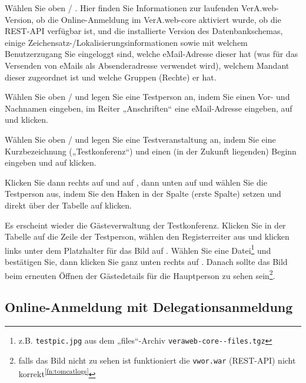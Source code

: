 Wählen Sie oben  / . Hier
finden Sie Informationen zur laufenden VerA.web-Version,
\ifoa
ob die Online-Anmeldung im VerA.web-core aktiviert wurde,
\fi%
ob die REST-API verfügbar ist, und die installierte Version des
Datenbankschemas, einige Zeichensatz-/Lokalisierungsinformationen sowie
mit welchem Benutzerzugang Sie eingeloggt sind, welche eMail-Adresse
dieser hat (was für das Versenden von eMails als Absenderadresse
verwendet wird), welchem Mandant dieser zugeordnet ist und welche
Gruppen (Rechte) er hat.

Wählen Sie oben  / 
und legen Sie eine Testperson an, indem Sie einen Vor- und Nachnamen
eingeben, im Reiter „Anschriften“ eine eMail-Adresse eingeben, auf
 und
 klicken.

Wählen Sie oben  /  und legen Sie eine Testveranstaltung an, indem Sie eine
Kurzbezeichnung („Testkonferenz“) und einen (in der Zukunft liegenden)
Beginn eingeben und auf  klicken.

Klicken Sie dann rechts auf  und auf
, dann unten auf 
und wählen Sie die Testperson aus, indem Sie den Haken in der Spalte
 (erste Spalte) setzen und direkt über der Tabelle auf
 klicken.

Es erscheint wieder die Gästeverwaltung der Testkonferenz. Klicken Sie
in der Tabelle auf die Zeile der Testperson, wählen den Registerreiter
 aus und klicken links unter dem Platzhalter
für das Bild auf . Wählen Sie eine
Datei\Hair\footnote{\label{fn:testpic}z.B. \texttt{testpic.jpg} aus dem
„files“-Archiv \texttt{veraweb-core-\vwiaverssw{}-files.tgz}} und bestätigen
Sie, dann klicken Sie ganz unten rechts auf .
Danach sollte das Bild beim erneuten Öffnen der Gästedetails für
die Hauptperson zu sehen sein\Hair\footnote{falls das Bild nicht
zu sehen ist funktioniert die \texttt{vwor.war} (REST-API) nicht
korrekt\Hair\textsuperscript{\ref{fn:tomcatlogs}}}.

\ifoa
\subsection{Online-Anmeldung mit Delegationsanmeldung}

